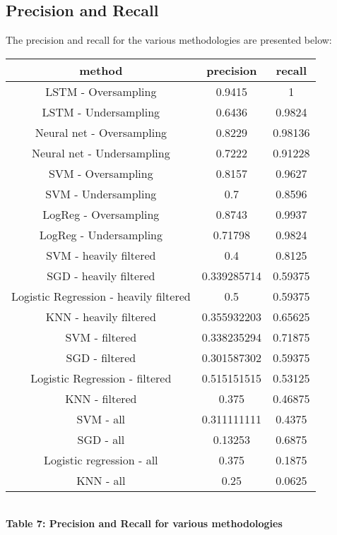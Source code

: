 \documentclass[12pt]{scrartcl}
\begin{document}
    \subsection{Precision and Recall}
    The precision and recall for the various methodologies are presented below:
    \begin{center}
    \begin{tabular}{|c|c|c|}
    \hline
    method & precision & recall\\
    \hline
    LSTM - Oversampling & 0.9415 & 1\\
    LSTM - Undersampling & 0.6436 & 0.9824\\
    Neural net - Oversampling & 0.8229 & 0.98136\\
    Neural net - Undersampling & 0.7222 & 0.91228\\
    SVM - Oversampling & 0.8157 & 0.9627\\
    SVM - Undersampling & 0.7 & 0.8596\\
    LogReg - Oversampling & 0.8743 & 0.9937\\
    LogReg - Undersampling & 0.71798& 0.9824\\
    SVM - heavily filtered & 0.4 & 0.8125\\
    SGD - heavily filtered & 0.339285714 & 0.59375\\
    Logistic Regression - heavily filtered & 0.5 & 0.59375\\
    KNN - heavily filtered & 0.355932203 & 0.65625\\
    SVM - filtered & 0.338235294 & 0.71875\\
    SGD - filtered & 0.301587302    & 0.59375\\
    Logistic Regression - filtered & 0.515151515 & 0.53125\\
    KNN - filtered & 0.375 & 0.46875\\
    SVM - all & 0.311111111 & 0.4375\\
    SGD - all & 0.13253 & 0.6875\\
    Logistic regression - all & 0.375 & 0.1875\\
    KNN - all & 0.25 & 0.0625\\
    
    \hline
    \end{tabular}\\
    \vspace{0.1in}
    \textbf{Table 7: Precision and Recall for various methodologies}  
    \end{center}
    
\end{document}

